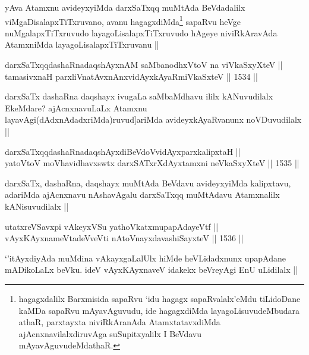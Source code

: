 \begin{artha}
yAva Atamxnu avideyxyiMda darxSaTxqq muMtAda BeVdadalilx viMgaDisalapxTiTxruvano, avanu hagagxdiMda\footnote{hagagxdalilx Barxmisida sapaRvu `idu hagagx sapaRvalalx'eMdu tiLidoDane kaMDa sapaRvu mAyavAguvudu, ide hagagxdiMda layagoLisuvudeMbudara athaR, parxtayxta niviRkAranAda AtamxtatavxdiMda ajAcnxnavilalxdiruvAga suSupitxyalilx I BeVdavu mAyavAguvudeMdathaR.} sapaRvu heVge nuMgalapxTiTxruvudo layagoLisalapxTiTxruvudo hAgeye niviRkAravAda AtamxniMda layagoLisalapxTiTxruvanu ||
\end{artha}

\begin{shl}
darxSaTxqqdashaRnadaqshAyxnAM saMbanodhxV\s toV na viVkaSxyXteV || \\
tamasivxnaH parxliVnatAvxnAnxvidAyxkAyaRmiVkaSxteV ||  1534 ||  
\end{shl}

\begin{artha}
darxSaTx dashaRna daqshayx ivugaLa saMbaMdhavu ililx kANuvudilalx EkeMdare? ajAcnxnavuLaLx Atamxnu layavAgi(dAdxnAdadxriMda)ruvud]ariMda avideyxkAyaRvanunx noVDuvudilalx ||
\end{artha}

\begin{shl}
darxSaTxqqdashaRnadaqshAyxdiBeVdoV\s vidAyxparxkalipxtaH || \\
yatoV\s toV moVhavidhavxswtx darxSATxrXdAyxtamxni neVkaSxyXteV ||  1535 ||  
\end{shl}

\begin{artha}
darxSaTx, dashaRna, daqshayx muMtAda BeVdavu avideyxyiMda kalipxtavu, adariMda ajAcnxnavu nAshavAgalu darxSaTxqq muMtAdavu Atamxnalilx kANisuvudilalx ||
\end{artha}

\begin{shl}
utatxreVSavxpi vAkeyxVSu yathoVkatxmupapAdayeVtf ||  \\
vAyxKAyxnameVtadeVveVti nAtoV\s nayxdavashiSayxteV ||  1536 ||  
\end{shl}

\begin{artha}
`\stext'itAyxdiyAda muMdina vAkayxgaLalUlx hiMde heVLidadxnunx upapAdane mADikoLaLx beVku. ideV vAyxKAyxnaveV idakekx beVreyAgi EnU uLidilalx ||
\end{artha}


